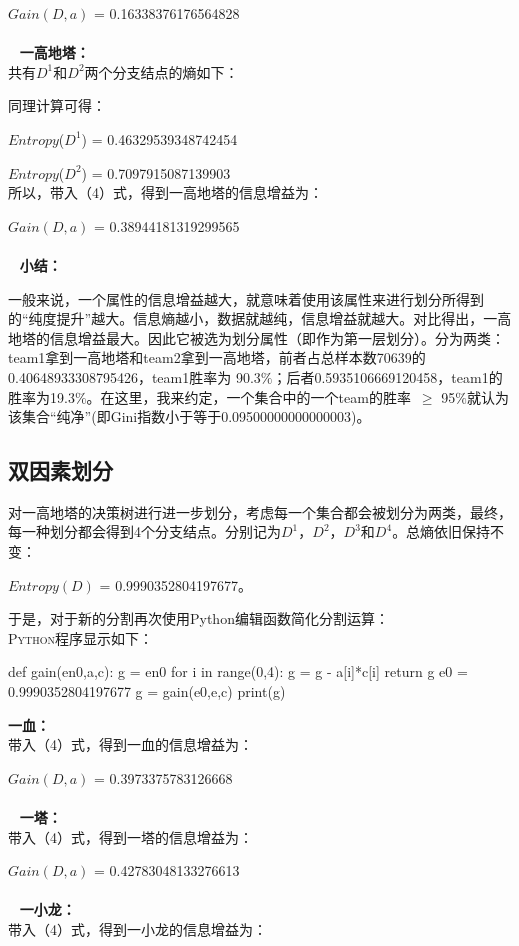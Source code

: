 \documentclass[lang=cn,11pt]{elegantpaper}
\begin{document}
$Gain(D,a)$ = 0.16338376176564828
\\~
\\~
\textbf{一高地塔：}\\
\quad 共有$D^1$和$D^2$两个分支结点的熵如下：

同理计算可得：

$Entropy$($D^1$) = 0.46329539348742454

$Entropy$($D^2$) = 0.7097915087139903\\
\quad 所以，带入（4）式，得到一高地塔的信息增益为：

$Gain(D,a)$ = 0.38944181319299565
\\~
\\~
\textbf{小结：}

一般来说，一个属性的信息增益越大，就意味着使用该属性来进行划分所得到的“纯度提升”越大。信息熵越小，数据就越纯，信息增益就越大。对比得出，一高地塔的信息增益最大。因此它被选为划分属性（即作为第一层划分）。分为两类：team1拿到一高地塔和team2拿到一高地塔，前者占总样本数70639的0.40648933308795426，team1胜率为 90.3$ \% $；后者0.5935106669120458，team1的胜率为19.3$\%$。在这里，我来约定，一个集合中的一个team的胜率~$\geq$ 95$ \% $就认为该集合“纯净”(即Gini指数小于等于0.09500000000000003)。

\subsection{双因素划分}
对一高地塔的决策树进行进一步划分，考虑每一个集合都会被划分为两类，最终，每一种划分都会得到4个分支结点。分别记为$D^1$，$D^2$，$D^3$和$D^4$。总熵依旧保持不变：

$Entropy(D)$  = 0.9990352804197677。

于是，对于新的分割再次使用Python编辑函数简化分割运算：\\
\textsc{Python}程序显示如下：
\begin{python}
def gain(en0,a,c):
    g = en0
    for i in range(0,4):
        g = g - a[i]*c[i]
    return g
e0 = 0.9990352804197677
g = gain(e0,e,c)
print(g)
\end{python}
\textbf{一血：}\\
带入（4）式，得到一血的信息增益为：

$Gain(D,a)$ = 0.3973375783126668
\\~
\\~
\textbf{一塔：}\\
带入（4）式，得到一塔的信息增益为：

$Gain(D,a)$ = 0.42783048133276613
\\~
\\~
\textbf{一小龙：}\\
带入（4）式，得到一小龙的信息增益为：
\end{document}
